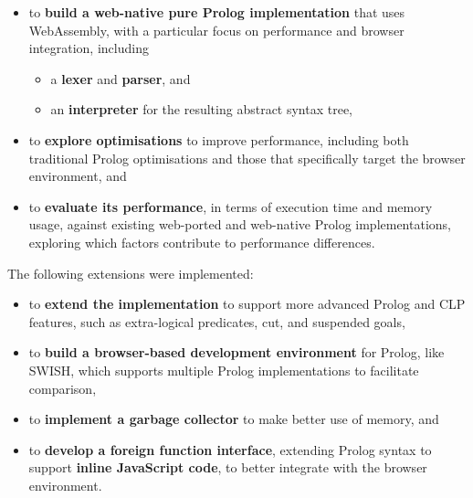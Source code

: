 \begin{itemize}
\item to \textbf{build a web-native pure Prolog implementation} that uses WebAssembly, with a particular focus on performance and browser integration, including
\begin{itemize}
\item a \textbf{lexer} and \textbf{parser}, and
\item an \textbf{interpreter} for the resulting abstract syntax tree,
\end{itemize}
\item to \textbf{explore optimisations} to improve performance, including both traditional Prolog optimisations and those that specifically target the browser environment, and
\item to \textbf{evaluate its performance}, in terms of execution time and memory usage, against existing web-ported and web-native Prolog implementations, exploring which factors contribute to performance differences.
\end{itemize}

The following extensions were implemented:

\begin{itemize}
\item to \textbf{extend the implementation} to support more advanced Prolog and CLP features, such as extra-logical predicates, cut, and suspended goals,
\item to \textbf{build a browser-based development environment} for Prolog, like SWISH, which supports multiple Prolog implementations to facilitate comparison,
\item to \textbf{implement a garbage collector} to make better use of memory, and
\item to \textbf{develop a foreign function interface}, extending Prolog syntax to support \textbf{inline JavaScript code}, to better integrate with the browser environment.
\end{itemize}